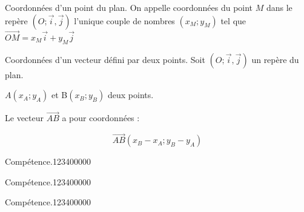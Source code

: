 \begin{pageCours}
\begin{DefT}{Coordonnées d'un point du plan.}
On appelle coordonnées du point $M$ dans le repère $(O;\vec{i},\vec{j})$ l'unique couple de nombres $(x_M;y_M)$ tel que $\vec{OM}=x_M\vec{i}+y_M\vec{j}$
\end{DefT}


\begin{PpT}{Coordonnées d'un vecteur défini par deux points.}
Soit $(O;\vec{i},\vec{j})$ un repère du plan.

$A(x_A;y_A)$ et  B$(x_B;y_B)$ deux points.

Le vecteur $\vec{AB}$ a pour coordonnées :

\[\vec{AB}(x_B-x_A;y_B-y_A)\]
\end{PpT}

\end{pageCours} %


\begin{pageAD}  %
\restoregeometry %


\begin{ExoCad}{Compétence.}{1234}{0}{0}{0}{0}{0}

\end{ExoCad}


\begin{ExoCad}{Compétence.}{1234}{0}{0}{0}{0}{0}

\end{ExoCad}


\begin{ExoCad}{Compétence.}{1234}{0}{0}{0}{0}{0}

\end{ExoCad}
 
\end{pageAD} %

